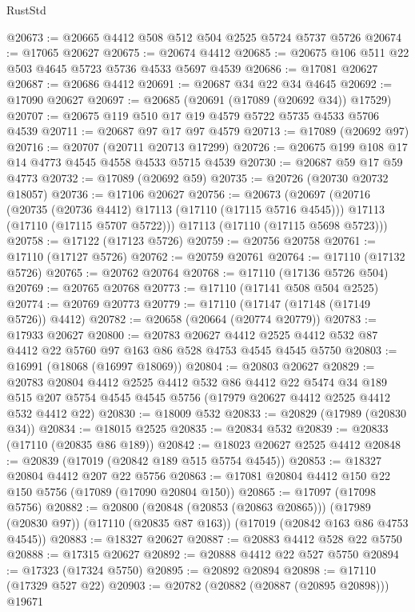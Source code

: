 \begin{lexlean}{RustStd}
\begin{coremodule}
@20673 := @20665 @4412 @508 @512 @504 @2525 @5724 @5737 @5726
@20674 := @17065 @20627
@20675 := @20674 @4412
@20685 := @20675 @106 @511 @22 @503 @4645 @5723 @5736 @4533 @5697 @4539
@20686 := @17081 @20627
@20687 := @20686 @4412
@20691 := @20687 @34 @22 @34 @4645
@20692 := @17090 @20627
@20697 := @20685 (@20691 (@17089 (@20692 @34)) @17529)
@20707 := @20675 @119 @510 @17 @19 @4579 @5722 @5735 @4533 @5706 @4539
@20711 := @20687 @97 @17 @97 @4579
@20713 := @17089 (@20692 @97)
@20716 := @20707 (@20711 @20713 @17299)
@20726 := @20675 @199 @108 @17 @14 @4773 @4545 @4558 @4533 @5715 @4539
@20730 := @20687 @59 @17 @59 @4773
@20732 := @17089 (@20692 @59)
@20735 := @20726 (@20730 @20732 @18057)
@20736 := @17106 @20627
@20756 := @20673
    (@20697
      (@20716
        (@20735 (@20736 @4412) @17113 (@17110 (@17115 @5716 @4545)))
        @17113
        (@17110 (@17115 @5707 @5722)))
      @17113
      (@17110 (@17115 @5698 @5723)))
@20758 := @17122 (@17123 @5726)
@20759 := @20756 @20758
@20761 := @17110 (@17127 @5726)
@20762 := @20759 @20761
@20764 := @17110 (@17132 @5726)
@20765 := @20762 @20764
@20768 := @17110 (@17136 @5726 @504)
@20769 := @20765 @20768
@20773 := @17110 (@17141 @508 @504 @2525)
@20774 := @20769 @20773
@20779 := @17110 (@17147 (@17148 (@17149 @5726)) @4412)
@20782 := @20658 (@20664 (@20774 @20779))
@20783 := @17933 @20627
@20800 := @20783
    @20627
    @4412
    @2525
    @4412
    @532
    @87
    @4412
    @22
    @5760
    @97
    @163
    @86
    @528
    @4753
    @4545
    @4545
    @5750
@20803 := @16991 (@18068 (@16997 @18069))
@20804 := @20803 @20627
@20829 := @20783
    @20804
    @4412
    @2525
    @4412
    @532
    @86
    @4412
    @22
    @5474
    @34
    @189
    @515
    @207
    @5754
    @4545
    @4545
    @5756
    (@17979 @20627 @4412 @2525 @4412 @532 @4412 @22)
@20830 := @18009 @532
@20833 := @20829 (@17989 (@20830 @34))
@20834 := @18015 @2525
@20835 := @20834 @532
@20839 := @20833 (@17110 (@20835 @86 @189))
@20842 := @18023 @20627 @2525 @4412
@20848 := @20839 (@17019 (@20842 @189 @515 @5754 @4545))
@20853 := @18327 @20804 @4412 @207 @22 @5756
@20863 := @17081 @20804 @4412 @150 @22 @150 @5756 (@17089 (@17090 @20804 @150))
@20865 := @17097 (@17098 @5756)
@20882 := @20800
    (@20848 (@20853 (@20863 @20865)))
    (@17989 (@20830 @97))
    (@17110 (@20835 @87 @163))
    (@17019 (@20842 @163 @86 @4753 @4545))
@20883 := @18327 @20627
@20887 := @20883 @4412 @528 @22 @5750
@20888 := @17315 @20627
@20892 := @20888 @4412 @22 @527 @5750
@20894 := @17323 (@17324 @5750)
@20895 := @20892 @20894
@20898 := @17110 (@17329 @527 @22)
@20903 := @20782 (@20882 (@20887 (@20895 @20898))) @19671

\end{coremodule}
\end{lexlean}
